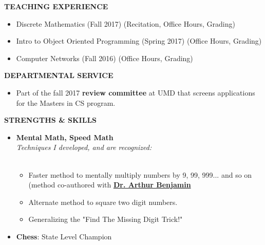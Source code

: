 \documentclass[a4paper,8pt]{article}
\newcommand{\isep}{-2 pt}
\newcommand{\resheading}[1]{\begin{tcolorbox} \begin{center} #1 \end{center} \end{tcolorbox}}
\begin{document}

\resheading{\textbf{TEACHING EXPERIENCE} }
\begin{itemize}[noitemsep]
\item \noindent Discrete Mathematics (Fall 2017) (Recitation, Office Hours, Grading)
\item \noindent Intro to Object Oriented Programming (Spring 2017) (Office Hours, Grading)
\item \noindent Computer Networks (Fall 2016) (Office Hours, Grading)
\end{itemize}

\resheading{\textbf{DEPARTMENTAL SERVICE} }
\begin{itemize}
\item \noindent Part of the fall 2017 \textbf{review committee} at UMD that screens applications for the Masters in CS program.
\end{itemize}



\resheading{\textbf{STRENGTHS \& SKILLS} }
\begin{itemize}[noitemsep]

\item \textbf{Mental Math, Speed Math}\\
 \emph{Techniques I developed, and are recognized:} \\[-0.6cm]\\
	\begin{itemize}\itemsep \isep
	\item Faster method to mentally multiply numbers by 9, 99, 999... and so on (method co-authored with \href{https://www.ted.com/talks/arthur_benjamin_does_mathemagic}{\textbf{Dr. Arthur Benjamin}}
	\item Alternate method to square two digit numbers.
	\item Generalizing the "Find The Missing Digit Trick!"

	\end{itemize}

\end{itemize}

\begin{itemize}
\item \noindent \textbf{Chess}: State Level Champion
\end{itemize}

\end{document}
